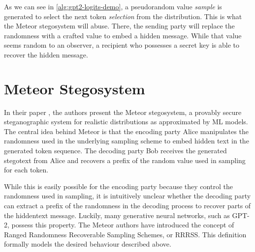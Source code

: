 As we can see in \autoref{alg:gpt2-logits-demo}, a pseudorandom value \emph{sample} is generated to select the next token \emph{selection} from the distribution.
This is what the Meteor stegosystem will abuse.
There, the sending party will replace the randomness with a crafted value to embed a hidden message.
While that value seems random to an observer, a recipient who possesses a secret key is able to recover the hidden message.







\section{Meteor Stegosystem}
\label{sec:meteor}
In their paper \cite{Meteor2021}, the authors present the Meteor stegosystem, a provably secure steganographic system for realistic distributions as approximated by ML models.
The central idea behind Meteor is that the encoding party Alice manipulates the randomness used in the underlying sampling scheme to embed hidden text in the generated token sequence.
The decoding party Bob receives the generated stegotext from Alice and recovers a prefix of the random value used in sampling for each token.

While this is easily possible for the encoding party because they control the randomness used in sampling, it is intuitively unclear whether the decoding party can extract a prefix of the randomness in the decoding process to recover parts of the hiddentext message.
Luckily, many generative neural networks, such as GPT-2, possess this property.
The Meteor authors have introduced the concept of Ranged Randomness Recoverable Sampling Schemes, or RRRSS.
This definition formally models the desired behaviour described above.

